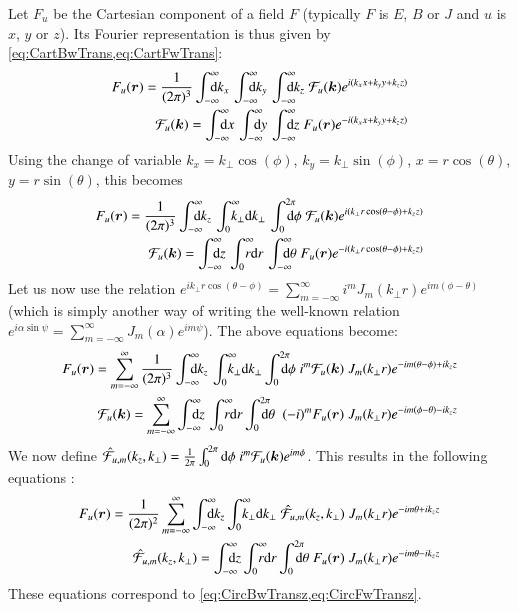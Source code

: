 Let $F_u$ be the Cartesian component of a field $F$ 
(typically $F$ is $E$, $B$ or $J$ and $u$ is $x$, $y$ or $z$). Its Fourier representation
is thus given by \cref{eq:CartBwTrans,eq:CartFwTrans}:
\begin{align*}
F_u(\vec{r}) = \frac{1}{(2\pi)^{3}}\Integ{k_x} \,\Integ{k_y}\,
\Integ{k_z} \; \mathcal{F}_u(\vec{k}) e^{i(k_x x + k_y y + k_z z)} \\
\mathcal{F}_u(\vec{k})  = \Integ{x} \,\Integ{y}\,
\Integ{z} \; F_u(\vec{r}) e^{-i(k_x x + k_y y + k_z z)} 
\end{align*}
Using the change of variable $k_x=k_\perp\cos(\phi)$, $k_y = k_\perp\sin(\phi)$,
$x=r\cos(\theta)$, $y=r\sin(\theta)$, this becomes
 \begin{align*}
F_u(\vec{r}) = \frac{1}{(2\pi)^{3}}\Integ{k_z} \,\RInteg{k_\perp}\,
\TInteg{\phi} \; \mathcal{F}_u(\vec{k})
e^{i(k_\perp r \cos(\theta-\phi) + k_z z)} \\
\mathcal{F}_u(\vec{k})   = \Integ{z} \,\RInteg{r}\,
\Integ{\theta} \; F_u(\vec{r}) e^{-i(k_\perp r \cos(\theta-\phi) + k_z z)} 
\end{align*}
Let us now use the relation $e^{ik_\perp r\cos(\theta-\phi)} =
\sum_{m=-\infty}^{\infty} i^m J_m(k_\perp r) e^{im(\phi-\theta)}$
(which is simply another way of writing the well-known relation
$e^{i \alpha \sin \psi} =\sum_{m=-\infty}^{\infty}J_m(\alpha)e^{im\psi}$). The above equations become:
\begin{align*}
F_u (\vec{r})  = \sum_{m=-\infty}^{\infty} \frac{1}{(2\pi)^{3}}\Integ{k_z} \,\RInteg{k_\perp }
\TInteg{\phi} \; i^m \mathcal{F}_u(\vec{k}) \;
J_m(k_\perp r) e^{-im(\theta-\phi) + ik_z z} \\
\mathcal{F}_u(\vec{k})   =  \sum_{m=-\infty}^{\infty} \Integ{z} \,\RInteg{r}
\TInteg{\theta} \;\; (-i)^m F_u(\vec{r}) \; J_m(k_\perp r) e^{-im(\phi-\theta) -ik_z z} 
\end{align*}
We now define $\hat{\mathcal{F}}_{u,m}(k_z,k_\perp ) = \frac{1}{2\pi}\int_0^{2\pi}
\mathrm{d}\phi \; i^m \mathcal{F}_u(\boldsymbol{k})
e^{im\phi}$. This results in the following equations :
\begin{align}
F_u(\vec{r}) =  \frac{1}{(2\pi)^2}\sum_{m=-\infty}^{\infty} \Integ{k_z}
\RInteg{k_\perp }\; \spectral{F}_{u,m}(k_z,k_\perp ) \; J_m(k_\perp r) e^{-im\theta + ik_z z} 
\\
\spectral{F}_{u,m}(k_z,k_\perp ) = \Integ{z} \RInteg{r}
\TInteg{\theta} \;F_u(\vec{r})\; J_m(k_\perp r) e^{-im\theta
 - i k_z z} \label{eq:CircBwTransu}
\end{align}
These equations correspond to \cref{eq:CircBwTransz,eq:CircFwTransz}.

